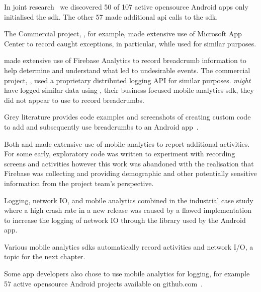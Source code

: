 In joint research~ we discovered 50 of 107 active opensource Android apps only initialised the  \Gls{sdk}. The other 57 made additional \Gls{api} calls to the \Gls{sdk}.

The Commercial project, , for example, made extensive use of Microsoft App Center to record caught exceptions, in particular, while  used  for similar purposes. 

 made extensive use of Firebase Analytics to record breadcrumb information to help determine and understand what led to undesirable events.  The commercial project, , used a proprietary distributed logging API for similar purposes.  \emph{might} have logged similar data using , their business focused mobile analytics \Gls{sdk}, they did not appear to use  to record breadcrumbs. 

Grey literature provides code examples and screenshots of creating custom code to add and subsequently use breadcrumbs to an Android app~. 

Both  and  made extensive use of mobile analytics to report additional activities. For  some early, exploratory code was written to experiment with recording screens and activities however this work was abandoned with the realisation that Firebase was collecting and providing demographic and other potentially sensitive information from the project team's perspective. 

Logging, network IO, and mobile analytics combined in the industrial case study where a high crash rate in a new release was caused by a flawed implementation to increase the logging of network IO through the  library used by the Android app. 

Various mobile analytics \Glspl{sdk} automatically record activities and network I/O, a topic for the next chapter. 

Some app developers also chose to use mobile analytics for logging, for example 57 active opensource Android projects available on github.com~.

